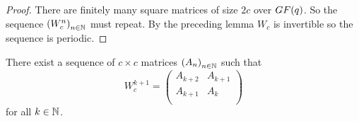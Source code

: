 \begin{proof}
  There are finitely many square matrices of size $2c$ over
  $GF(q)$. So the sequence $\left(W_{c}^{n}\right)_{n\in\mathbb{N}}$ must
  repeat. By the preceding lemma $W_{c}$ is invertible so the
  sequence is periodic.
\end{proof}

\begin{lemma}[$W$-structure]
  There exist a sequence of $c \times c$ matrices
  $\left(A_{n}\right)_{n\in\mathbb{N}}$ such that
  \[
  W_{c}^{k+1}
  =
  \left(
  \begin{array}{cc}
    A_{k+2} & A_{k+1} \\
    A_{k+1} & A_{k}   \\
  \end{array}
  \right)  
  \]
  for all $k\in\mathbb{N}$.
\end{lemma}

